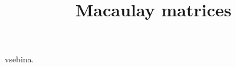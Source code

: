 \documentclass[mat2, anglescina, tisk]{fmfdelo}
\title{Macaulay matrices}
\begin{document}
vsebina.
\end{document}
